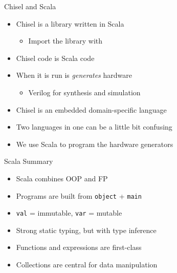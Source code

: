 \begin{frame}[fragile]{Chisel and Scala}
\begin{itemize}
\item Chisel is a library written in Scala
\begin{itemize}
\item Import the library with 
\end{itemize}
\item Chisel code is Scala code
\item When it is run is \emph{generates} hardware
\begin{itemize}
\item Verilog for synthesis and simulation
\end{itemize}
\item Chisel is an embedded domain-specific language
\item Two languages in one can be a little bit confusing
\item We use Scala to program the hardware generators
\end{itemize}
\end{frame}








\begin{frame}{Scala Summary}
\begin{itemize}
    \item Scala combines OOP and FP
    \item Programs are built from \texttt{object} + \texttt{main}
    \item \texttt{val} = immutable, \texttt{var} = mutable
    \item Strong static typing, but with type inference
    \item Functions and expressions are first-class
    \item Collections are central for data manipulation
\end{itemize}
\end{frame}

